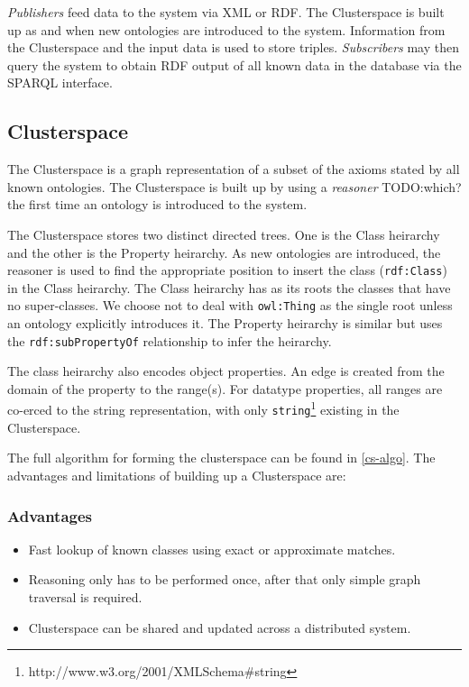 \documentclass[conference]{IEEEtran}
\begin{document}
\emph{Publishers} feed data to the system via XML or RDF. The Clusterspace is
built up as and when new ontologies are introduced to the system. Information
from the Clusterspace and the input data is used to store triples.
\emph{Subscribers} may then query the system to obtain RDF output of all known
data in the database via the SPARQL interface.

\subsection{Clusterspace}
The Clusterspace is a graph representation of a subset of the axioms stated by
all known ontologies. The Clusterspace is built up by using a \emph{reasoner}
TODO:which? the first time an ontology is introduced to the system. 

The Clusterspace stores two distinct directed trees. One is the Class heirarchy
and the other is the Property heirarchy. As new ontologies are introduced, the
reasoner is used to find the appropriate position to insert the class
(\texttt{rdf:Class}) in the Class heirarchy. The Class heirarchy has as its
roots the classes that have no super-classes. We choose not to deal with
\texttt{owl:Thing} as the single root unless an ontology explicitly introduces
it. The Property heirarchy is similar but uses the \texttt{rdf:subPropertyOf}
relationship to infer the heirarchy.

The class heirarchy also encodes object properties. An edge is created from the
domain of the property to the range(s). For datatype properties, all ranges are
co-erced to the string representation, with only
\texttt{string}\footnote{http://www.w3.org/2001/XMLSchema\#string} existing in
the Clusterspace.

The full algorithm for forming the clusterspace can be found in \ref{cs-algo}.
The advantages and limitations of building up a Clusterspace are:

\subsubsection*{Advantages}
\begin{itemize}
    \item Fast lookup of known classes using exact or approximate matches.
    \item Reasoning only has to be performed once, after that only simple graph
        traversal is required.
    \item Clusterspace can be shared and updated across a distributed system.
\end{itemize}
\end{document}
